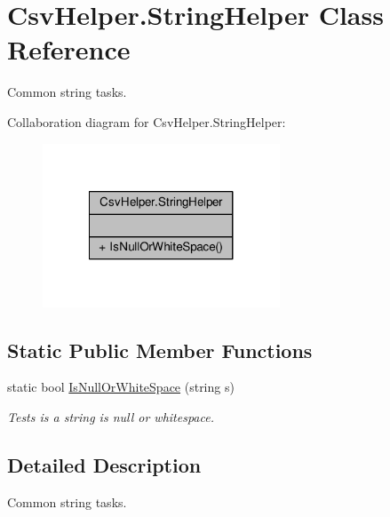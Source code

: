 \hypertarget{a00144}{\section{Csv\-Helper.\-String\-Helper Class Reference}
\label{a00144}
}


Common string tasks.  




Collaboration diagram for Csv\-Helper.\-String\-Helper\-:
\nopagebreak
\begin{figure}[H]
\begin{center}
\leavevmode
\includegraphics[width=200pt]{d4/d6d/a00402}
\end{center}
\end{figure}
\subsection*{Static Public Member Functions}
\begin{DoxyCompactItemize}
\item 
static bool \hyperlink{a00144_a40c715a7ebf19c7053c7b10f2b3df80f}{Is\-Null\-Or\-White\-Space} (string s)
\begin{DoxyCompactList}\small\item\em Tests is a string is null or whitespace. \end{DoxyCompactList}\end{DoxyCompactItemize}


\subsection{Detailed Description}
Common string tasks. 



